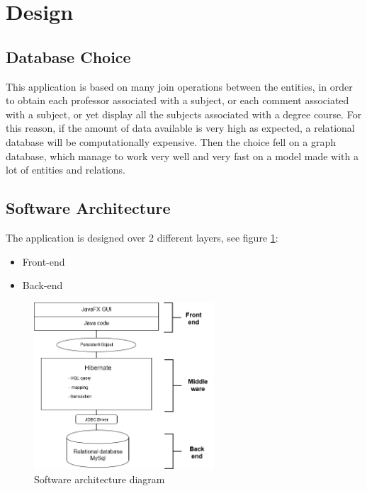 \documentclass[a4paper]{article}
\begin{document}
\clearpage
\section{Design}

\subsection{Database Choice}
This application is based on many join operations between the entities, in order to obtain each professor associated with a subject, or each comment associated with a subject, or yet display all the subjects associated with a degree course. For this reason, if the amount of data available is very high as expected, a relational database will be computationally expensive. Then the choice fell on a graph database, which manage to work very well and very fast on a model made with a lot of entities and relations.

\subsection{Software Architecture}
The application is designed over 2 different layers, see figure \ref{fig:architecture_diagram}:
\begin{itemize}
\item Front-end
\item Back-end
\end{itemize}
\begin{figure}[h]
\centering
\includegraphics[width=0.6\textwidth]{./images/diagrams/architecture_diagram.png} 
\caption{Software architecture diagram\\}
\label{fig:architecture_diagram}
\end{figure}

\clearpage
\end{document}
